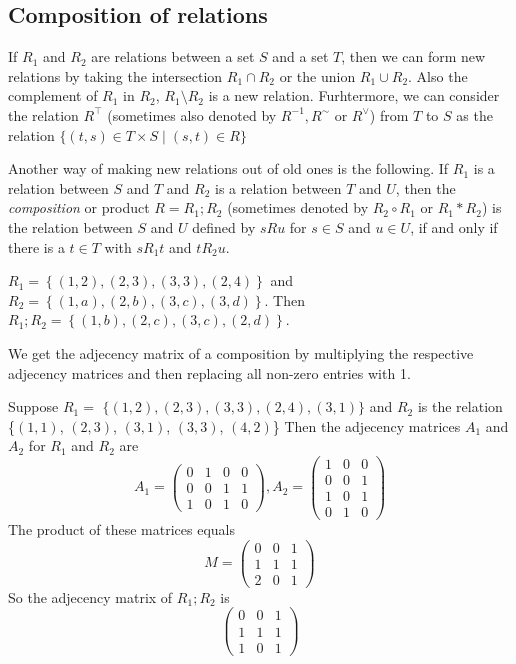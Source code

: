 \subsection{Composition of relations}
If $R_1$ and $R_2$ are relations between a set $S$ and a set $T$, then we can form new relations
by taking the intersection $R_1 \cap R_2$ or the union $R_1 \cup R_2$. Also the complement of $R_1$
in $R_2$, $R_1 \setminus R_2$ is a new relation. Furhtermore, we can consider the relation $R^{\top}$
(sometimes also denoted by $R^{-1}, R^{\sim} \text{ or } R^{\vee}$) from $T$ to $S$ as the relation
$ \{(t,s) \in T \times S \mid (s,t) \in R\} $

Another way of making new relations out of old ones is the following. If $R_1$ is a relation between $S$ and
$T$ and $R_2$ is a relation between $T$ and $U$, then the \emph{composition} or product $R=R_1;R_2$ (sometimes
denoted by $R_2 \circ R_1$ or $R_1 * R_2$) is the relation between $S$ and $U$ defined by $sRu$ for $s \in S$ and $u \in U$, if and
only if there is a $t \in T$ with $sR_1t$ and $tR_2u$.

\begin{example}
    $ R_1 = \left\{(1,2),(2,3),(3,3),(2,4)\right\} $ and $R_2 = \left\{(1,a), (2,b), (3,c), (3,d)\right\}$.
    Then $ R_1;R_2 = \left\{(1,b), (2,c), (3,c), (2,d)\right\} $.
\end{example}

We get the adjecency matrix of a composition by multiplying the respective adjecency matrices and then replacing
all non-zero entries with 1.

\begin{example}
    Suppose $R_1 = $ $\{(1,2),(2,3),(3,3), (2,4), (3,1)\}$ and $R_2$ is the relation \{\(\left(1,1\right)\),
    \(\left(2,3\right)\), \(\left(3,1\right)\), \(\left(3,3\right)\), \(\left(4,2\right)\)\}
    Then the adjecency matrices $A_1$ and $A_2$ for $R_1$ and $R_2$ are
    \[
        A_1 = \begin{pmatrix}
            0 & 1& 0& 0 \\
            0 & 0 & 1 & 1 \\
            1 & 0 & 1 & 0
        \end{pmatrix},
        A_2 = \begin{pmatrix}
            1 & 0 & 0 \\
            0 & 0 & 1 \\
            1 & 0 & 1 \\
            0 & 1 & 0
        \end{pmatrix}
    \]
    The product of these matrices equals
    $$ M = \begin{pmatrix}
        0&0&1 \\
        1&1&1 \\
        2&0&1
    \end{pmatrix} $$
    So the adjecency matrix of $R_1;R_2$ is
    $$\begin{pmatrix}
        0&0&1 \\
        1&1&1 \\
        1&0&1
    \end{pmatrix}$$
\end{example}

